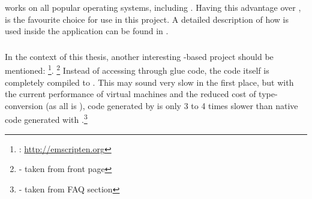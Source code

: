  works on all popular operating systems, including . Having this advantage over ,  is the favourite choice for use in this project. A detailed description of how  is used inside the application can be found in .

\subsubsection{}

In the context of this thesis, another interesting -based project should be mentioned: \footnote{: \url{http://emscripten.org}}. \footnote{\citep{EmscriptenHP} - taken from front page} Instead of accessing  through glue code, the  code itself is completely compiled to . This may sound very slow in the first place, but with the current performance of  virtual machines and the reduced cost of type-conversion (as all is ), code generated by  is only 3 to 4 times slower than native code generated with .\footnote{\citep{EmscriptenHP} - taken from FAQ section}
